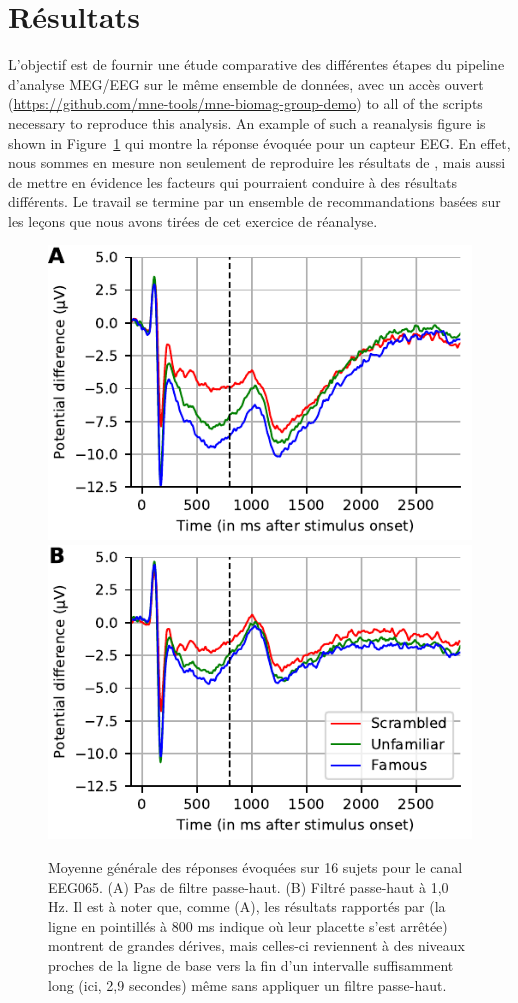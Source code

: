 \section*{Résultats}

L'objectif est de fournir une étude comparative des différentes étapes du pipeline d'analyse MEG/EEG sur le même ensemble de données, avec un accès ouvert (\url{https://github.com/mne-tools/mne-biomag-group-demo}) to all of the scripts necessary to reproduce this analysis. An example of such a reanalysis figure is shown in Figure~\ref{fig:sommaire:grand_average} qui montre la réponse évoquée pour un capteur EEG. En effet, nous sommes en mesure non seulement de reproduire les résultats de \citet{wakeman2015multi}, mais aussi de mettre en évidence les facteurs qui pourraient conduire à des résultats différents. Le travail se termine par un ensemble de recommandations basées sur les leçons que nous avons tirées de cet exercice de réanalyse.

\begin{figure}[htb]
  \centering
  \includegraphics[width=0.7\linewidth]{figures/grand_average_highpass-NoneHz.pdf}\\
  \includegraphics[width=0.7\linewidth]{figures/grand_average_highpass-1Hz.pdf}
\caption[]{Moyenne générale des réponses évoquées sur 16 sujets pour le canal EEG065. (A) Pas de filtre passe-haut. (B) Filtré passe-haut à 1,0 Hz. Il est à noter que, comme (A), les résultats rapportés par \cite{wakeman2015multi} (la ligne en pointillés à 800 ms indique où leur placette s'est arrêtée) montrent de grandes dérives, mais celles-ci reviennent à des niveaux proches de la ligne de base vers la fin d'un intervalle suffisamment long (ici, 2,9 secondes) même sans appliquer un filtre passe-haut.}
\label{fig:sommaire:grand_average}
\end{figure}  

